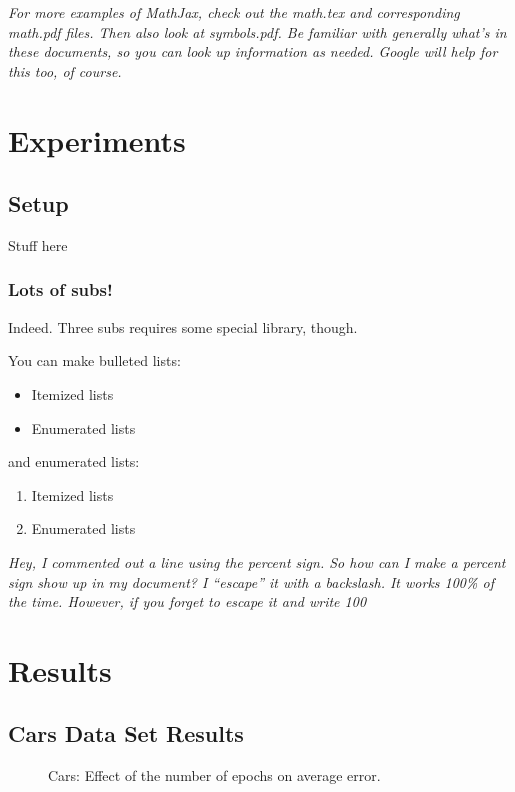 \documentclass[twocolumn,letterpaper,10pt]{article}
\begin{document}
{\it For more examples of MathJax, check out the math.tex and corresponding math.pdf files. Then also look at symbols.pdf. Be familiar with generally what's in these documents, so you can look up information as needed. Google will help for this too, of course.}

\section{Experiments}
\subsection{Setup}
Stuff here

\subsubsection{Lots of subs!}
Indeed. Three subs requires some special library, though.

You can make bulleted lists:
\begin{itemize}
	\item Itemized lists
	\item Enumerated lists
\end{itemize}

\noindent and enumerated lists:
\begin{enumerate}
	\item Itemized lists
	\item Enumerated lists
\end{enumerate}


{\it Hey, I commented out a line using the percent sign. So how can I make a percent sign show up in my document? I ``escape'' it with a backslash. It works 100\% of the time. However, if you forget to escape it and write 100%
}

\section{Results}

\subsection{Cars Data Set Results}

\begin{figure}
\begin{center}
\end{center}
\caption{Cars: Effect of the number of epochs on average error.}
\label{fig:CarsNumEpochs}
\end{figure}
\end{document}
